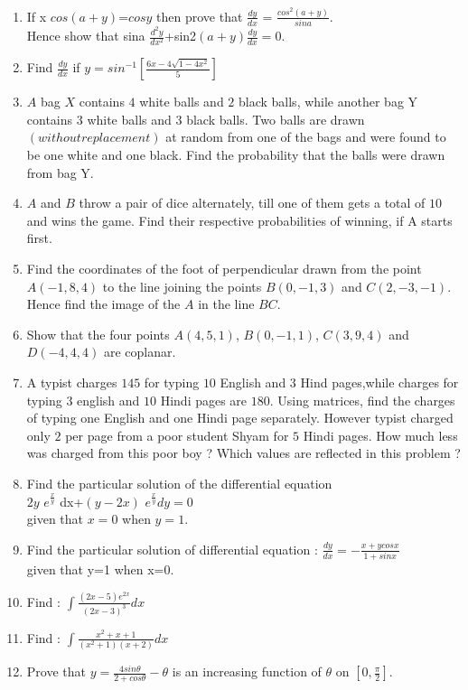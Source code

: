 \documentclass[12pt,-letter paper]{article}
\providecommand{\brak}[1]{\ensuremath{\left(#1\right)}}
\begin{document}
\begin{enumerate}
\item If x $cos(a+y)$=$cosy$ then prove that $\frac{dy}{dx}$ = $\frac{cos^2\brak{a+y}}{sina}$. \\
Hence show that sina $\frac{d^2y}{dx^2}$+sin2\brak{a+y}$\frac{dy}{dx}=0$.
\item Find $\frac{dy}{dx}$ if $y=sin^{-1}[\frac{6x-4\sqrt{1-4x^2}}{5}]$
\item $A$ bag $X$ contains $4$ white balls and $2$ black balls, while another bag Y contains $3$ white balls and
$3$ black balls. Two balls are drawn \brak{without replacement} at random from one of the bags and were found to be one white and one black. Find the probability that the balls were drawn from bag Y.
\item $A$ and $B$ throw a pair of dice alternately, till one of them gets a total of $10$ and wins the  game. 
Find their respective probabilities of winning, if A starts first.
\item Find the coordinates of the foot of perpendicular
drawn from the point $A\brak{-1,8,4}$ to the line joining the points $B\brak{0,-1,3}$ and $C\brak{2,-3,-1}$. Hence find the image of the $A$ in the line $BC$.
\item Show that the four points $A\brak{4,5,1}$, $B\brak{0,-1, 1}$, $C\brak{3,9,4}$ and $D\brak{-4,4,4}$ are coplanar.
\item A typist charges \rupee $145$ for typing $10$ English and $3$ Hind pages,while charges for typing $3$ english and $10$ Hindi pages are \rupee $180$. Using matrices, find the charges of typing one English and one Hindi page separately. However typist charged only \rupee $2$ per page from a poor student Shyam for $5$ Hindi pages. How much less was charged from this poor boy ? Which values are reflected in this problem ? 
\item Find the particular solution of the differential equation \\ $2y$ $e^{\frac{x}{y}}$ dx+\brak{y-2x} $e^{\frac{x}{y}} dy={0}$ \\ given that $x=0$ when $y=1$.
\item Find the particular solution of differential equation : $\frac{dy}{dx}=-\frac{x+ycosx}{1+sinx}$ \\ given that y=1 when x=0.
\item Find : $\int\frac{\brak{2x-5}e^{2x}}{\brak{2x-3}^3}dx$
\item Find : $\int\frac{x^2+x+1}{\brak{x^2+1}\brak{x+2}}dx$
\item Prove that $y=\frac{4sin\theta}{2+cos\theta}-\theta$ is an increasing function of $\theta$ on $[0,\frac{\pi}{2}]$.

\end{enumerate}
\end{document}
